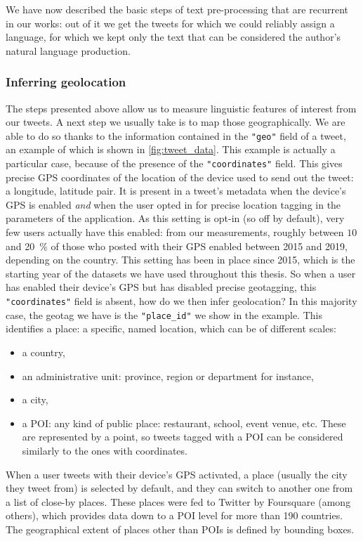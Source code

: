 \documentclass[../thesis.tex]{subfiles}
\begin{document}
We have now described the basic steps of text pre-processing that are recurrent in our
works: out of it we get the tweets for which we could reliably assign a language,
for which we kept only the text that can be considered the author's natural language production.


\subsubsection{Inferring geolocation}
\label{sec:method_geoloc}
The steps presented above allow us to measure linguistic features of interest from our
tweets. A next step we usually take is to map those geographically. We are
able to do so thanks to the information contained in the \texttt{"geo"} field of a
tweet, an example of which is shown in \cref{fig:tweet_data}. This example is actually a
particular case, because of the presence of the \texttt{"coordinates"} field. This gives
precise GPS coordinates of the location of the device used to send out the tweet: a
longitude, latitude pair. It is present in a tweet's metadata when the device's GPS is
enabled \emph{and} when the user opted in for precise location tagging in the parameters
of the application. As this setting is opt-in (so off by default), very few users
actually have this enabled: from our measurements, roughly between $10$ and
\SI{20}{\percent} of those who posted with their GPS enabled between 2015 and 2019,
depending on the country. This setting has been in place since 2015, which is the
starting year of the datasets we have used throughout this thesis. So when a user
has enabled their device's GPS but has disabled precise geotagging, this
\texttt{"coordinates"} field is absent, how do we then infer geolocation? In this majority
case, the geotag we have is the \texttt{"place\_id"} we show in the example. This
identifies a place: a specific, named location, which can be of different scales:
\begin{itemize}
    \item a country,
    \item an administrative unit: province, region or department for instance,
    \item a city,
    \item a \ac{POI}: any kind of public place: restaurant, school, event venue, etc.
    These are represented by a point, so tweets tagged with a \ac{POI} can be considered
    similarly to the ones with coordinates.
\end{itemize}
When a user tweets with their device's GPS activated, a place (usually the city they
tweet from) is selected by default, and they can switch to another one from a list of
close-by places. These places were fed to Twitter by Foursquare
\cite{FoursquarePlaces2019} (among others), which provides data down to a \ac{POI} level
for more than 190 countries. The geographical extent of places other than \acp{POI} is
defined by bounding boxes.
\end{document}

